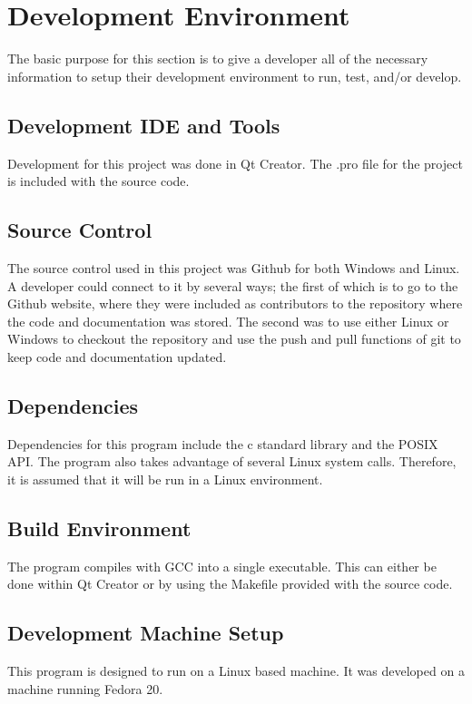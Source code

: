 \chapter{Development Environment}
The basic purpose for this section is to give a developer all of the necessary 
information to setup their development environment to run, test, and/or develop.

\section{Development IDE and Tools}
Development for this project was done in Qt Creator. The .pro file for the project is included with 
the source code.

\section{Source  Control}
The source control used in this project was Github for both Windows and Linux. A developer could connect 
to it by several ways; the first of which is to go to the Github website, where they were included as 
contributors to the repository where the code and documentation was stored. The second was to use either 
Linux or Windows to checkout the repository and use the push and pull functions of git to keep code and 
documentation updated.

\section{Dependencies}
Dependencies for this program include the c standard library and the POSIX API. The program also takes 
advantage of several Linux system calls. Therefore, it is assumed that it will be run in a Linux environment.

\section{Build  Environment}
The program compiles with GCC into a single executable. This can either be done within Qt Creator or by using 
the Makefile provided with the source code. 

\section{Development Machine Setup}
This program is designed to run on a Linux based machine.
It was developed on a machine running Fedora 20.

